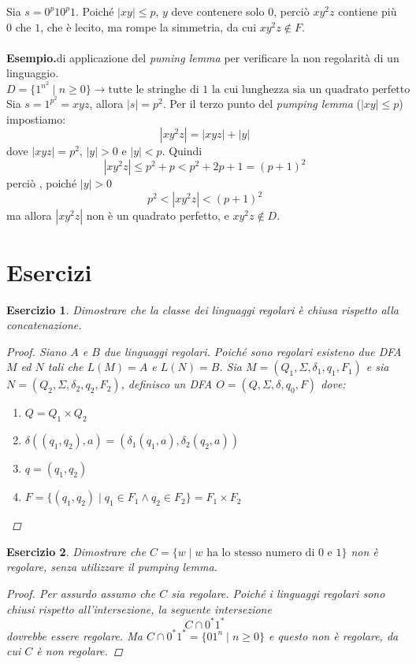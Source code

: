 \documentclass[italian]{article}
\newcommand{\taleche}{\;|\;}
\newtheorem*{exercize*}{Esercizio}
\newcommand{\example}{\noindent\textbf{Esempio.\quad}}
\begin{document}
Sia $s = 0^p10^p1$. Poiché $|xy| \leq p$, $y$ deve contenere solo $0$, perciò $xy^2z$ contiene più $0$ che $1$, che è lecito, ma rompe la simmetria, da cui $xy^2z \notin F$.\\\\
\example di applicazione del \textit{puming lemma} per verificare la non regolarità di un linguaggio.
\[
	D = \{ 1^{n^2} \taleche n \geq 0 \} \to \text{tutte le stringhe di 1 la cui lunghezza sia un quadrato perfetto}
\]
Sia $s = 1^{p^2} = xyz$, allora $|s| = p^2$. Per il terzo punto del \textit{pumping lemma} ($|xy|\leq p$) impostiamo:
\[
	|xy^2z| = |xyz| + |y|
\]
dove $|xyz| = p^2$, $|y| > 0$ e $|y| < p$.
Quindi
\[
	|xy^2z| \leq p^2 + p < p^2 +2p + 1 = (p+1)^2
\]
perciò , poiché $|y|>0$
\[
	p^2 < |xy^2z| < (p+1)^2
\]
ma allora $|xy^2z|$ non è un quadrato perfetto, e $xy^2z \notin D$.
\pagebreak
\section{Esercizi}
\begin{exercize*}
	Dimostrare che la classe dei linguaggi regolari è chiusa rispetto alla concatenazione. 
	\begin{proof}
		Siano $A$ e $B$ due linguaggi regolari. Poiché sono regolari esisteno due DFA $M$ ed $N$ tali che $L(M) = A$ e $L(N)=B$. Sia $M = (Q_1,\Sigma,\delta_1,q_1,F_1)$ e sia $N = (Q_2,\Sigma,\delta_2,q_2,F_2)$, definisco un DFA $O = (Q,\Sigma,\delta,q_0,F)$ dove:
		\begin{enumerate}
			\item $Q = Q_1 \times Q_2$
			\item $\delta((q_1,q_2),a) = (\delta_1(q_1,a),\delta_2(q_2,a))$
			\item $q=(q_1,q_2)$
			\item $F=\{(q_1,q_2) \taleche q_1 \in F_1 \land q_2 \in F_2\} = F_1 \times F_2$
		\end{enumerate}
	\end{proof}
\end{exercize*}
\begin{exercize*}
	Dimostrare che $C=\{ w \taleche w \text{ ha lo stesso numero di 0 e 1}\}$ non è regolare, senza utilizzare il \textit{pumping lemma}.
	\begin{proof}
		Per assurdo assumo che $C$ sia regolare. Poiché i linguaggi regolari sono chiusi rispetto all'intersezione, la seguente intersezione
		\[
			C \cap 0^*1^*
		\]
		dovrebbe essere regolare. Ma $C \cap 0^*1^* = \{ 01^n \taleche n \geq 0 \}$ e questo non è regolare, da cui $C$ è non regolare. 
	\end{proof}
\end{exercize*}
\end{document}
